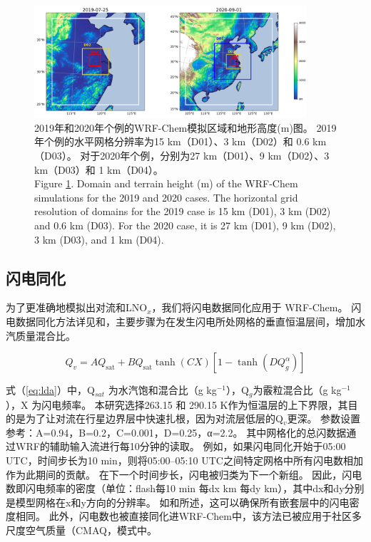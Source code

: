 \begin{figure}[htbp]
\centering
\includegraphics[width=0.9\textwidth]{./figures/domains_china.png}
\caption{2019年和2020年个例的WRF-Chem模拟区域和地形高度(m)图。
2019年个例的水平网格分辨率为15 km（D01）、3 km（D02）和 0.6 km（D03）。
对于2020年个例，分别为27 km（D01）、9 km（D02）、3 km（D03）和 1 km（D04）。\\
Figure \ref{fig:domains_china}. Domain and terrain height (m) of the WRF-Chem simulations for the 2019 and 2020 cases. The horizontal grid resolution of
domains for the 2019 case is 15 km (D01), 3 km (D02) and 0.6 km (D03). For the 2020 case, it is 27 km (D01), 9 km (D02), 3 km (D03),
and 1 km (D04).}
\label{fig:domains_china}
\end{figure}

\subsection{闪电同化} \label{sect:lightning_assimilation}

为了更准确地模拟出对流和LNO$_x$，我们将闪电数据同化应用于 WRF-Chem。
闪电数据同化方法详见\citet{Fierro.2012}和\citet{Li.2017b}，主要步骤为在发生闪电所处网格的垂直恒温层间，增加水汽质量混合比。

\begin{equation} \label{eq:lda}
Q_{v}=A Q_{\mathrm{sat}}+B Q_{\mathrm{sat}} \tanh (C X)\left[1-\tanh \left(D Q_{g}^{\alpha}\right)\right]
\end{equation}

式（\ref{eq:lda}）中，Q$_{sat}$ 为水汽饱和混合比（g kg$^{−1}$），Q$_g$为霰粒混合比（g kg$^{−1}$），X 为闪电频率。
本研究选择263.15 和 290.15 K作为恒温层的上下界限，其目的是为了让对流在行星边界层中快速扎根，因为对流层低层的Q$_v$更深\citep{Marchand.2014,Finney.2016,Li.2017b}。
参数设置参考\citet{Li.2017b}：A=0.94，B=0.2，C=0.001，D=0.25，α=2.2。
其中网格化的总闪数据通过WRF的辅助输入流进行每10分钟的读取。
例如，如果闪电同化开始于05:00 UTC，时间步长为10 min，则将05:00--05:10 UTC之间特定网格中所有闪电数相加作为此期间的贡献。
在下一个时间步长，闪电被归类为下一个新组。
因此，闪电数即闪电频率的密度（单位：flash每10 min 每dx km 每dy km），其中dx和dy分别是模型网格在x和y方向的分辨率。
如\citet{Fierro.2012}和\citet{Li.2017b}所述，这可以确保所有嵌套层中的闪电密度相同。
此外，闪电数也被直接同化进WRF-Chem中，该方法已被应用于社区多尺度空气质量（CMAQ，\citet{Kang.2019,Kang.2019a,Kang.2020}模式中。

